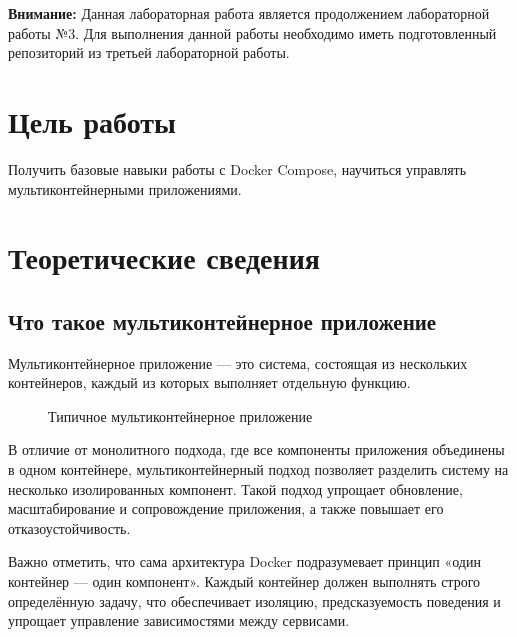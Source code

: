 \documentclass[12pt,a4paper]{article}
\begin{document}
\makelabcover

\commoninstructions

\textbf{Внимание:} Данная лабораторная работа является продолжением лабораторной работы №3.
Для выполнения данной работы необходимо иметь подготовленный репозиторий из третьей лабораторной работы.

\section{Цель работы}

Получить базовые навыки работы с Docker Compose, научиться управлять мультиконтейнерными приложениями.

\section{Теоретические сведения}

\subsection{Что такое мультиконтейнерное приложение}

Мультиконтейнерное приложение — это система, состоящая из нескольких контейнеров, каждый из которых выполняет
отдельную функцию.

%
%
%
\begin{figure}[H]
    \centering
    
    \caption{Типичное мультиконтейнерное приложение}
    \label{fig:multicontainers-app}
\end{figure}

В отличие от монолитного подхода, где все компоненты приложения объединены в одном контейнере, мультиконтейнерный подход
позволяет разделить систему на несколько изолированных компонент. Такой подход упрощает обновление, масштабирование и
сопровождение приложения, а также повышает его отказоустойчивость.

Важно отметить, что сама архитектура Docker подразумевает принцип «один контейнер — один компонент».
Каждый контейнер должен выполнять строго определённую задачу, что обеспечивает изоляцию, предсказуемость поведения
и упрощает управление зависимостями между сервисами.
\end{document}
